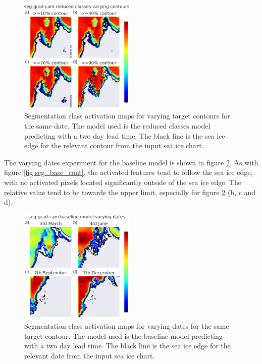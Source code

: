 \documentclass[../main/thesis.tex]{subfiles}
\begin{document}
\begin{figure}
    \centering
    \includegraphics[width=0.49\textwidth]{reduced_classes_contours}
    \caption{\label{fig:seg_red_cont}Segmentation class activation maps for varying target contours for the same date. The model used is the reduced classes model predicting with a two day lead time. The black line is the sea ice edge for the relevant contour from the input sea ice chart.}
\end{figure}

The varying dates experiment for the baseline model is shown in figure \ref{fig:seg_base_dates}. As with figure \ref{fig:seg_base_cont}, the activated features tend to follow the sea ice edge, with no activated pixels located significantly outside of the sea ice edge. The relative value tend to be towards the upper limit, especially for figure \ref{fig:seg_base_dates} (b, c and d).

\begin{figure}
    \centering
    \includegraphics[width=0.49\textwidth]{baseline_dates}
    \caption{\label{fig:seg_base_dates}Segmentation class activation maps for varying dates for the same target contour. The model used is the baseline model predicting with a two day lead time. The black line is the sea ice edge for the relevant date from the input sea ice chart.}
\end{figure}
\end{document}
